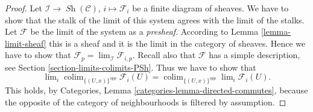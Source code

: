 \documentclass[10pt,a4paper]{amsart}
\theoremstyle{plain}
\theoremstyle{definition}
\theoremstyle{remark}
\numberwithin{equation}{subsection}
\def\lim{\mathop{\mathrm{lim}}\nolimits}
\def\colim{\mathop{\mathrm{colim}}\nolimits}
\def\Sh{\mathop{\mathit{Sh}}\nolimits}
\begin{document}
\begin{proof}
Let $\mathcal{I} \to \Sh(\mathcal{C})$,
$i \mapsto \mathcal{F}_i$ be a finite diagram of sheaves.
We have to show that the stalk of the limit of this
system agrees with the limit of the stalks.
Let $\mathcal{F}$ be the limit of the system as a {\it presheaf}.
According to Lemma \ref{lemma-limit-sheaf} this is a sheaf and
it is the limit in the category of sheaves.
Hence we have to show that
$\mathcal{F}_p = \lim_\mathcal{I} \mathcal{F}_{i, p}$.
Recall also that $\mathcal{F}$ has a simple description, see
Section \ref{section-limits-colimits-PSh}. Thus we have to show that
$$
\lim_i \colim_{\{(U, x)\}^{opp}} \mathcal{F}_i(U)
=
\colim_{\{(U, x)\}^{opp}} \lim_i \mathcal{F}_i(U).
$$
This holds, by Categories, Lemma \ref{categories-lemma-directed-commutes},
because the opposite of the category of neighbourhoods is filtered
by assumption.
\end{proof}
\end{document}
